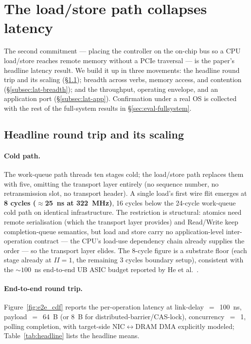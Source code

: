 \documentclass[10pt,twocolumn]{article}
\begin{document}
\section{The load/store path collapses latency}
\label{sec:eval-latency}

The second commitment --- placing the controller on the on-chip bus
so a CPU load/store reaches remote memory without a PCIe traversal
--- is the paper's headline latency result. We build it up in three
movements: the headline round trip and its scaling
(\S\ref{subsec:lat-headline}); breadth across verbs, memory access,
and contention (\S\ref{subsec:lat-breadth}); and the throughput,
operating envelope, and an application port
(\S\ref{subsec:lat-app}). Confirmation under a real OS is collected
with the rest of the full-system results in
\S\ref{sec:eval-fullsystem}.

\subsection{Headline round trip and its scaling}
\label{subsec:lat-headline}

\paragraph{Cold path.}
\label{subsec:loadstore-microbench}
The work-queue path threads ten stages cold; the load/store path
replaces them with five, omitting the transport layer entirely (no
sequence number, no retransmission slot, no transport header). A
single load's first wire flit emerges at \textbf{8 cycles
($\approx$25~ns at 322~MHz)}, 16 cycles below the 24-cycle
work-queue cold path on identical infrastructure. The restriction
is structural: atomics need remote serialisation (which the
transport layer provides) and Read/Write keep completion-queue
semantics, but load and store carry no application-level
inter-operation contract --- the CPU's load-use dependency chain
already supplies the order --- so the transport layer elides. The
8-cycle figure is a substrate floor (each stage already at
$II{=}1$, the remaining 3 cycles boundary setup), consistent with
the ${\sim}100$~ns end-to-end UB ASIC budget
reported by He et al.~\cite{he2026:tau}.

\paragraph{End-to-end round trip.}
Figure~\ref{fig:e2e_cdf} reports the per-operation latency at
link-delay~$=$~100~ns, payload~$=$~64~B (or 8~B for
distributed-barrier/CAS-lock), concurrency~$=$~1,
polling completion, with target-side NIC$\leftrightarrow$DRAM
DMA explicitly modeled; Table~\ref{tab:headline} lists the headline
means.
\end{document}
